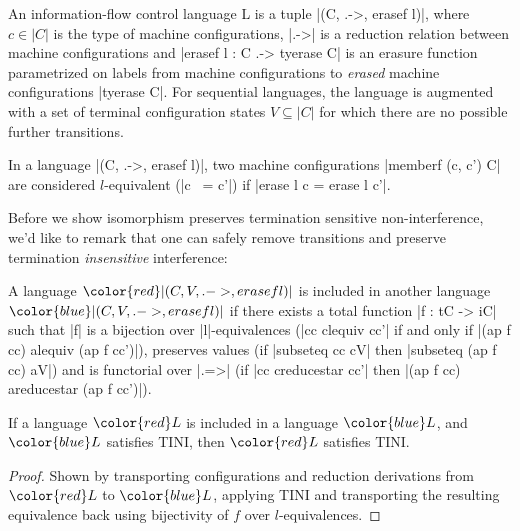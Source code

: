 \begin{definition}
    An information-flow control language L is a tuple |(C, .->,
    erasef l)|, where $c \in |C|$ is the type of machine configurations, |.->| is a
    reduction relation between machine configurations and |erasef l : C .-> tyerase C|
    is an erasure function parametrized on labels from machine configurations to \emph{erased} machine
    configurations |tyerase C|.  For sequential languages, the
    language is augmented with a set of terminal configuration states $V
    \subseteq |C|$ for which there are no possible further transitions.
\end{definition}

\begin{definition}[$l$-equivalence]
    In a language |(C, .->, erasef l)|, two machine configurations
    |memberf (c, c') C| are considered $l$-equivalent (|c ~= c'|)
    if |erase l c = erase l c'|.
\end{definition}

\newcommand{\con}[1]{\ensuremath{{\color{red} #1}}}
\newcommand{\abs}[1]{\ensuremath{{\color{blue} #1}}}

Before we show isomorphism preserves termination sensitive
non-interference, we'd like to remark that one can safely remove transitions
and preserve termination \emph{insensitive} interference:

\begin{definition}
    A language \con{|(C, V, .->, erasef l)|} is included in another
    language \abs{|(C, V, .->, erasef l)|} if there exists a total function |f : tC -> iC| such that
    |f| is a bijection over |l|-equivalences (|cc clequiv cc'| if and only if
    |(ap f cc) alequiv (ap f cc')|),
    preserves values (if |subseteq cc cV| then |subseteq (ap f cc) aV|) and is
    functorial over |.=>| (if
    |cc creducestar cc'| then |(ap f cc) areducestar (ap f cc')|).
\end{definition}

\begin{theorem}
    If a language \con{L} is included in a language \abs{L}, and \abs{L}
    satisfies TINI, then \con{L} satisfies TINI.
\end{theorem}

\begin{proof}
    Shown by transporting configurations and reduction derivations
    from \con{L} to \abs{L}, applying TINI and transporting the resulting
    equivalence back using bijectivity of $f$ over $l$-equivalences.
\end{proof}

